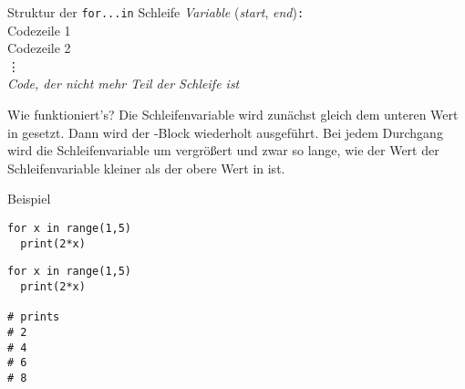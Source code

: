 \begin{frame}

	\renewcommand{\baselinestretch}{1.5}
	\begin{block}{Struktur der \texttt{for...in} Schleife}
		\vspace{2pt}
		\pause {} \pause \textit{Variable} \pause {} \pause {}(\textit{start}, \textit{end})\pause\texttt{:} \pause \\
		\spacechar\spacechar Codezeile 1 \pause \\ 
\spacechar\spacechar Codezeile 2 \pause \\
\spacechar\spacechar \phantom{Code} \vdots \pause  \\
\textit{Code, der nicht mehr Teil der Schleife ist}
	\end{block}

\vspace{12pt}
\pause 

	\renewcommand{\baselinestretch}{1}
	\begin{block}{Wie funktioniert's?}
		\vspace{2pt}
	Die Schleifenvariable wird zunächst gleich dem unteren Wert in  gesetzt. Dann wird der -Block wiederholt ausgeführt. Bei jedem Durchgang wird die Schleifenvariable um  vergrößert und zwar so lange, wie der Wert der Schleifenvariable kleiner als der obere Wert in  ist. 	
	\end{block}
\end{frame}

\begin{fragile}
\begin{exampleblock}{Beispiel}
\vspace{2pt}
	
	\begin{overprint}
\begin{verbatim}
for x in range(1,5)
  print(2*x)
\end{verbatim}
\begin{verbatim}
for x in range(1,5)
  print(2*x)

# prints 
# 2
# 4
# 6
# 8
\end{verbatim}
\end{overprint}
\end{exampleblock}
\end{fragile}


